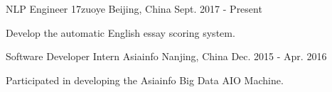 

\begin{cventries}

  \cventry
    {NLP Engineer} %
    {17zuoye} %
    {Beijing, China} %
    {Sept. 2017 - Present} %
    {
      \begin{cvitems} %
        \item {Develop the automatic English essay scoring system.}
      \end{cvitems}
    }

  \cventry
    {Software Developer Intern} %
    {Asiainfo} %
    {Nanjing, China} %
    {Dec. 2015 - Apr. 2016} %
    {
      \begin{cvitems} %
        \item {Participated in developing the Asiainfo Big Data AIO Machine.}
      \end{cvitems}
    }


\end{cventries}